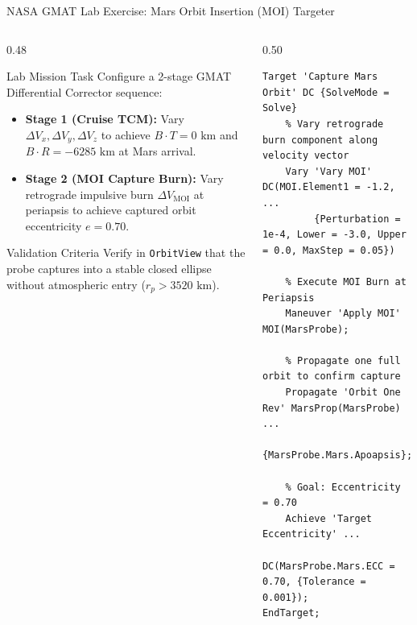 \documentclass[aspectratio=169, 10pt]{beamer}
\begin{document}
\begin{frame}[fragile]{NASA GMAT Lab Exercise: Mars Orbit Insertion (MOI) Targeter}
    \begin{columns}[t]
        \begin{column}{0.48\textwidth}
            \begin{block}{Lab Mission Task}
                \scriptsize
                Configure a 2-stage GMAT Differential Corrector sequence:
                \begin{itemize}\setlength{\itemsep}{1pt}
                    \item \textbf{Stage 1 (Cruise TCM):} Vary $\Delta V_x, \Delta V_y, \Delta V_z$ to achieve $B\cdot T = 0\text{ km}$ and $B\cdot R = -6285\text{ km}$ at Mars arrival.
                    \item \textbf{Stage 2 (MOI Capture Burn):} Vary retrograde impulsive burn $\Delta V_{\text{MOI}}$ at periapsis to achieve captured orbit eccentricity $e = 0.70$.
                \end{itemize}
            \end{block}
            \begin{alertblock}{Validation Criteria}
                \scriptsize
                Verify in \texttt{OrbitView} that the probe captures into a stable closed ellipse without atmospheric entry ($r_p > 3520\text{ km}$).
            \end{alertblock}
        \end{column}

        \begin{column}{0.50\textwidth}
\begin{lstlisting}[style=gmatstyle]
% STAGE 2: MARS CAPTURE INSERTION BURN
Target 'Capture Mars Orbit' DC {SolveMode = Solve}
    % Vary retrograde burn component along velocity vector
    Vary 'Vary MOI' DC(MOI.Element1 = -1.2, ...
         {Perturbation = 1e-4, Lower = -3.0, Upper = 0.0, MaxStep = 0.05})
    
    % Execute MOI Burn at Periapsis
    Maneuver 'Apply MOI' MOI(MarsProbe);
    
    % Propagate one full orbit to confirm capture
    Propagate 'Orbit One Rev' MarsProp(MarsProbe) ...
         {MarsProbe.Mars.Apoapsis};
         
    % Goal: Eccentricity = 0.70
    Achieve 'Target Eccentricity' ...
         DC(MarsProbe.Mars.ECC = 0.70, {Tolerance = 0.001});
EndTarget;
\end{lstlisting}
        \end{column}
    \end{columns}
\end{frame}
\end{document}
